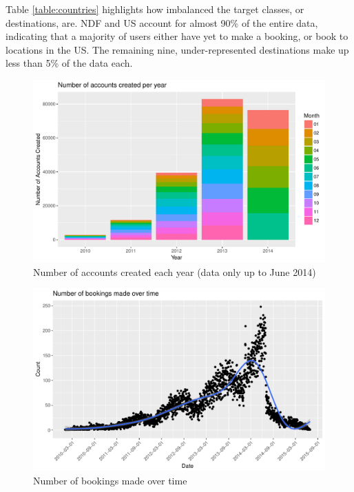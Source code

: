 \documentclass{article}
\begin{document}
Table \ref{table:countries} highlights how imbalanced the target classes, or destinations, are. NDF and US
account for almost 90\% of the entire data, indicating that a majority of users either 
have yet to make a booking, or book to locations in the US. The remaining nine, under-represented 
destinations make up less than 5\% of the data each.  

\begin{figure}[!htbp]
  \includegraphics[scale = 0.5]{accountscreated.pdf}
  \caption{Number of accounts created each year (data only up to June 2014)}
  \label{fig:acct_created}
\end{figure}

\begin{figure}[!htbp]
  \includegraphics[scale=0.5]{bookingsovertime.pdf}
  \caption{Number of bookings made over time}
  \label{fig:bookings}
\end{figure}
\end{document}
